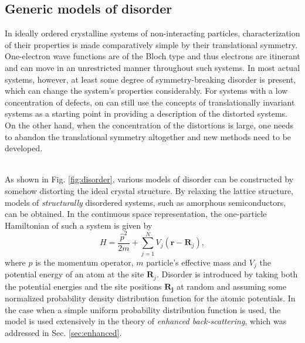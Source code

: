 \documentclass[10pt,a4paper]{article}
\begin{document}
\subsection{Generic models of disorder}
In ideally ordered crystalline systems of non-interacting particles, characterization of their properties is made comparatively simple by their translational symmetry. One-electron wave functions are of the Bloch type and thus electrons are itinerant and can move in an unrestricted manner throughout such systems. In most actual systems, however, at least some degree of symmetry-breaking disorder is present, which can change the system's properties considerably. For systems with a low concentration of defects, on can still use the concepts of translationally invariant systems as a starting point in providing a description of the distorted systems. On the other hand, when the concentration of the distortions is large, one needs to abandon the translational symmetry altogether and new methods need to be developed. \\\\
\noindent  
\begin{minipage}[t]{0.6\textwidth}
\noindent As shown in Fig. \ref{fig:disorder}, various models of disorder can be constructed by somehow distorting the ideal crystal structure. By relaxing the lattice structure, models of \emph{structurally} disordered systems, such as amorphous semiconductors, can be obtained. In the continuous space representation, the one-particle Hamiltonian of such a system is given by
\begin{equation}\label{eq:amorphous_hamiltonian}
H=\frac{\hat{p}^2}{2m} + \sum\limits_{j=1}^N V_j(\mathbf{r}-\mathbf{R}_j),  
\end{equation}
where $\hat{p}$ is the momentum operator, $m$ particle's effective mass and $V_j$ the potential energy of an atom at the site $\mathbf{R}_j$. Disorder is introduced by taking both the potential energies and the site positions $\mathbf{R_j}$ at random and assuming some normalized probability density distribution function for the atomic potentials. In the case when a simple uniform probability distribution function is used, the model is used extensively in the theory of \emph{enhanced back-scattering}, which was addressed in Sec. \ref{sec:enhanced}.
\end{minipage}\hfill
\end{document}
